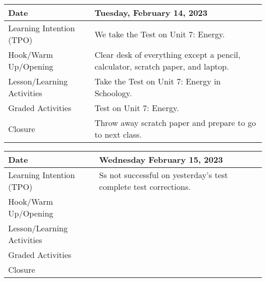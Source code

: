 \documentclass[main.tex]{subfiles}
\begin{document}
\begin{tabular}{|m{}|m{}|}
    \hline  
    \cellcolor{black!20}\textbf{Date} &
    \cellcolor{black!20}\textbf{Tuesday, February 14, 2023} \\
    \hline
    Learning Intention (TPO) & We take the Test on Unit 7: Energy.\\
    \hline
    Hook/Warm Up/Opening & Clear desk of everything except a pencil, calculator, scratch paper, and laptop.\\
    \hline
    Lesson/Learning Activities & Take the Test on Unit 7: Energy in Schoology.\\
    \hline
    Graded Activities & Test on Unit 7: Energy.\\
    \hline
    Closure & Throw away scratch paper and prepare to go to next class.\\  
    \hline
\end{tabular} 

\begin{tabular}{|m{}|m{}|}
    \hline  
    \cellcolor{black!20}\textbf{Date} &
    \cellcolor{black!20}\textbf{Wednesday February 15, 2023} \\
    \hline
    Learning Intention (TPO) & Ss not successful on yesterday's test complete test corrections.\\
    \hline
    Hook/Warm Up/Opening & \\
    \hline
    Lesson/Learning Activities & \\
    \hline
    Graded Activities & \\
    \hline
    Closure & \\  
    \hline
\end{tabular} 
\end{document}
